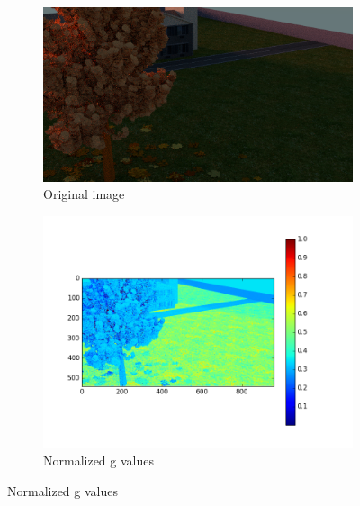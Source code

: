 \documentclass[fleqn,10pt]{SelfArx} %
\begin{document}
\begin{figure}
        \begin{subfigure}[b]{0.5\textwidth}
                \includegraphics[width=\linewidth]{Figures/ColorFigures/im20001.png}
                \caption{Original image}
                \label{fig:ColIm}
        \end{subfigure}%
        \begin{subfigure}[b]{0.5\textwidth}
                \includegraphics[width=\linewidth]{Figures/ColorFigures/res1_2.png}
                \caption{Normalized g values}
                \label{fig:NormrColIm2}
        \end{subfigure}%
        

\end{figure}
\end{document}

